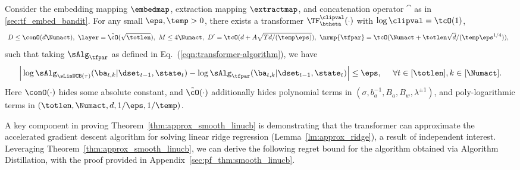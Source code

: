 \documentclass[10pt]{article}
\newcommand{\authnote}[2]{{\scriptsize $\ll$\textsf{#1 notes: #2}$\gg$}}
\newcommand{\authnote}[2]{}
\newcommand{\lc}[1]{{\color{blue}\authnote{Licong}{#1}}}
\begin{document}
\begin{theorem}\label{thm:approx_smooth_linucb}
Consider the embedding mapping $\embedmap$, extraction mapping $\extractmap$, and concatenation operator $\cat$ as in \ref{sec:tf_embed_bandit}. For any small $\eps,\temp>0$, there exists a transformer $\TF_\btheta^{\clipval}(\cdot)$ with $\log \clipval = \tcO(1)$, 
\begin{equation}
\begin{aligned}
&~D \le \conO(d\Numact),~ \layer=\tilde \cO(\sqrt{\totlen}),~ M \le 4\Numact,~D' = \tcO(d+A\sqrt{Td/(\temp\eps)}), ~\nrmp{\tfpar} = \tcO(\Numact+\totlen\sqrt{d}/(\temp\eps^{1/4})), \label{eq:linucb_tf_param} 
\end{aligned}
\end{equation}
such that taking $\sAlg_{\tfpar}$ as defined in Eq.~(\ref{eqn:transformer-algorithm}), we have
\[
\Big|\log \sAlg_{\sLinUCB(\tau)}(\ba_{t,k}|\dset_{t-1},\state_t) - \log \sAlg_{\tfpar}(\ba_{t,k}|\dset_{t-1},\state_t) \Big|\leq \eps, ~~~~\forall t\in[\totlen],k\in[\Numact].
\]
Here $\conO(\cdot)$ hides some absolute constant, and  $\tilde \cO(\cdot)$ additionally hides polynomial terms in $(\sigma, b_a^{-1}, B_a, B_w, \lambda^{\pm1})$, and poly-logarithmic terms in $(\totlen, \Numact, d, 1/\eps,1/\temp)$. 
\end{theorem}


A key component in proving Theorem~\ref{thm:approx_smooth_linucb} is demonstrating that the transformer can approximate the accelerated gradient descent algorithm for solving linear ridge regression (Lemma~\ref{lm:approx_ridge}), a result of independent interest. Leveraging Theorem~\ref{thm:approx_smooth_linucb}, we can derive the following regret bound for the algorithm obtained via Algorithm Distillation, with the proof provided in Appendix~\ref{sec:pf_thm:smooth_linucb}.
\end{document}
